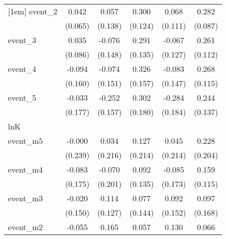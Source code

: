 {\begin{tabular}{l*{5}{c}}
[1em]
event\_2     &       0.042         &       0.057         &       0.300\sym{*}  &       0.068         &       0.282\sym{**} \\
            &     (0.065)         &     (0.138)         &     (0.124)         &     (0.111)         &     (0.087)         \\
[1em]
event\_3     &       0.035         &      -0.076         &       0.291\sym{*}  &      -0.067         &       0.261\sym{*}  \\
            &     (0.086)         &     (0.148)         &     (0.135)         &     (0.127)         &     (0.112)         \\
[1em]
event\_4     &      -0.094         &      -0.074         &       0.326\sym{*}  &      -0.083         &       0.268\sym{*}  \\
            &     (0.160)         &     (0.151)         &     (0.157)         &     (0.147)         &     (0.115)         \\
[1em]
event\_5     &      -0.033         &      -0.252         &       0.302         &      -0.284         &       0.244         \\
            &     (0.177)         &     (0.157)         &     (0.180)         &     (0.184)         &     (0.137)         \\
\hline
lnK         &                     &                     &                     &                     &                     \\
event\_m5    &      -0.000         &       0.034         &       0.127         &       0.045         &       0.228         \\
            &     (0.239)         &     (0.216)         &     (0.214)         &     (0.214)         &     (0.204)         \\
[1em]
event\_m4    &      -0.083         &      -0.070         &       0.092         &      -0.085         &       0.159         \\
            &     (0.175)         &     (0.201)         &     (0.135)         &     (0.173)         &     (0.115)         \\
[1em]
event\_m3    &      -0.020         &       0.114         &       0.077         &       0.092         &       0.097         \\
            &     (0.150)         &     (0.127)         &     (0.144)         &     (0.152)         &     (0.168)         \\
[1em]
event\_m2    &      -0.055         &       0.165         &       0.057         &       0.130         &       0.066         \\

\end{tabular}}
